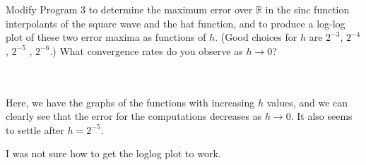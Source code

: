 Modify Program 3 to determine the maximum error over $\mathbb{R}$ in the sinc function interpolants
of the square wave and the hat function, and to produce a log-log plot of these two error maxima as
functions of $h$. (Good choices for $h$ are $2^{-3}$, $2^{-4}$, $2^{-5}$ , $2^{-6}$.) What convergence
rates do you observe as $h\rightarrow0$?\\\\

\begin{solution}\renewcommand{\qedsymbol}{}\ \\
    Here, we have the graphs of the functions with increasing $h$ values, and we can clearly see that
    the error for the computations decreases as $h\rightarrow0$. It also seems to settle after
    $h=2^{-5}$.


I was not sure how to get the loglog plot to work.

\end{solution}

\newpage

\newpage
